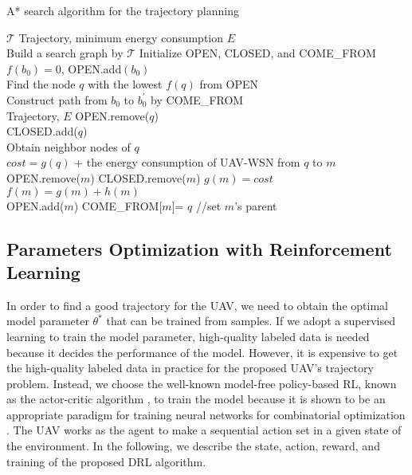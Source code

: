 \documentclass[journal]{IEEEtran}
\begin{document}
    \begin{algorithm}[t!]
	\caption{A* search algorithm for the trajectory planning}
	\label{alg1}
	\begin{algorithmic}[1]
		\renewcommand{\algorithmicrequire}{\textbf{Input:}}
		\renewcommand{\algorithmicensure}{\textbf{Output:}}
		\REQUIRE $\bm{\mathcal{T}}$
	    \ENSURE  Trajectory, minimum energy consumption $E$\\
	    \STATE Build a search graph by $\bm{\mathcal{T}}$
	    \STATE Initialize OPEN, CLOSED, and COME\_FROM\\
	    \STATE $f(b_0) = 0$, OPEN.add$(b_0)$\\
	         \STATE Find the node $q$ with the lowest $f(q)$ from OPEN\\
	         \STATE Construct path from $b_0$ to $b_0^{'}$ by COME\_FROM\\
	         \RETURN Trajectory, $E$
	         \ENDIF
	         \STATE OPEN.remove($q$)\\
	         \STATE CLOSED.add($q$)\\
	         \STATE Obtain neighbor nodes of $q$ \\
	             \STATE $cost = g(q)$ + the energy consumption of UAV-WSN from $q$ to $m$\\
	                \STATE OPEN.remove($m$)
	             \ENDIF
	                \STATE CLOSED.remove($m$)
	             \ENDIF
	                 \STATE $g(m) = cost$\\
	                 \STATE $f(m) = g(m) + h(m)$\\
	                 \STATE OPEN.add($m$)
	                  \STATE COME\_FROM[$m$]= $q$ //set $m$'s parent
	              \ENDIF
	         \ENDFOR
	     \ENDWHILE
	\end{algorithmic}
    \end{algorithm}

	
	\subsection{Parameters Optimization with Reinforcement Learning}
	 In order to find a good trajectory for the UAV, we need to obtain the optimal model parameter $\theta^*$ that can be trained from samples. If we adopt a supervised learning to train the model parameter, high-quality labeled data is needed because it decides the performance of the model. However, it is expensive to get the high-quality labeled data in practice for the proposed UAV's trajectory problem. Instead, we choose the well-known model-free policy-based RL, known as the actor-critic algorithm \cite{V. R. Konda}, to train the model because it is shown to be an appropriate paradigm for training neural networks for combinatorial optimization \cite{I. Bello}. The UAV works as the agent to make a sequential action set in a given state of the environment. In the following, we describe the state, action, reward, and training of the proposed DRL algorithm.
\end{document}
